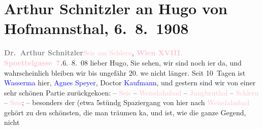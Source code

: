 

               \section[Arthur Schnitzler an Hugo von Hofmannsthal, 6. 8. 1908]{ Arthur Schnitzler an Hugo von Hofmannsthal, 6. 8. 1908}\nopagebreak{}\rehead{ }\normalsize\beginnumbering{} \toendnotes[C]{\smallbreak\pagebreak[2]} 
\toendnotes[C]{\smallbreak}\pstart
           {\pb}\textcolor{gray}{\textbf{Dr. Arthur Schnitzler}}\hfill \textcolor{pink}{Seis am Schlern}{}\ledrightnote{\textcolor{pink}{Seis am Schlern}},\pend
           \pstart
           \textcolor{gray}{\textbf{\textcolor{pink}{Wien XVIII. Spoettelgasse 7}{}\ledrightnote{\textcolor{pink}{Edmund-Weiß-Gasse}}.}}\hfill 6. 8. 08\pend
           \pstart{}lieber Hugo, \pend\pstart
           Sie sehen, wir sind noch i{\geminationm}er da, und wahrscheinlich
               bleiben wir bis ungefähr 20. we{\geminationn} nicht
               länger. Seit 10 Tagen ist \textcolor{blue}{Wasserma{\geminationn}}{}\ledrightnote{\textcolor{blue}{Jakob Wassermann}} hier, \textcolor{blue}{Agnes Speyer}{}\ledrightnote{\textcolor{blue}{Agnes Ulmann}}, Doctor \textcolor{blue}{Kaufmann}{}\ledrightnote{\textcolor{blue}{Arthur Kaufmann}}, und gestern sind wir von einer sehr schönen Partie
                  zurückgeko{\geminationm}en: – \textcolor{pink}{Seis}{}\ledrightnote{\textcolor{pink}{Seis am Schlern}} – \textcolor{pink}{Weisslahnbad}{}\ledrightnote{\textcolor{pink}{Weisslahnbad}} – \textcolor{pink}{Jungbru{\geminationn}thal}{}\ledrightnote{\textcolor{pink}{Jungbrunntal}} – \textcolor{pink}{Schlern}{}\ledrightnote{\textcolor{pink}{Schlern}} – \textcolor{pink}{Seis}{}\ledrightnote{\textcolor{pink}{Seis am Schlern}}; – besonders der
               (etwa 5stündg Spaziergang von hier nach \textcolor{pink}{Weisslahnbad}{}\ledrightnote{\textcolor{pink}{Weisslahnbad}} gehört zu {\pb}den schönsten, die man
               träumen ka{\geminationn}, und ist, wie die ganze Gegend, nicht
